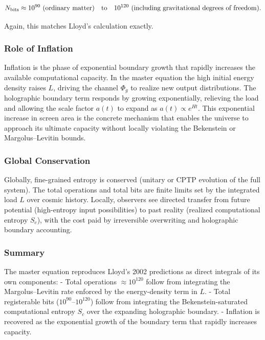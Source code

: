\documentclass[reprint,amsmath,amssymb,aps,prd,preprintnumbers,superscriptaddress,longbibliography,10pt]{revtex4-2}
\begin{document}
\[
N_{\rm bits} \approx 10^{90} \text{ (ordinary matter)} \quad \text{to} \quad 10^{120} \text{ (including gravitational degrees of freedom)}.
\]

Again, this matches Lloyd’s calculation exactly.

\subsubsection{Role of Inflation}

Inflation is the phase of exponential boundary growth that rapidly increases the available computational capacity. In the master equation the high initial energy density raises \(L\), driving the channel \(\Phi_g\) to realize new output distributions. The holographic boundary term responds by growing exponentially, relieving the load and allowing the scale factor \(a(t)\) to expand as \(a(t) \propto e^{Ht}\). This exponential increase in screen area is the concrete mechanism that enables the universe to approach its ultimate capacity without locally violating the Bekenstein or Margolus–Levitin bounds.

\subsubsection{Global Conservation}

Globally, fine-grained entropy is conserved (unitary or CPTP evolution of the full system). The total operations and total bits are finite limits set by the integrated load \(L\) over cosmic history. Locally, observers see directed transfer from future potential (high-entropy input possibilities) to past reality (realized computational entropy \(S_c\)), with the cost paid by irreversible overwriting and holographic boundary accounting.

\subsubsection{Summary}

The master equation reproduces Lloyd’s 2002 predictions as direct integrals of its own components:
- Total operations \(\approx 10^{120}\) follow from integrating the Margolus–Levitin rate enforced by the energy-density term in \(L\).
- Total registerable bits (\(10^{90}\)–\(10^{120}\)) follow from integrating the Bekenstein-saturated computational entropy \(S_c\) over the expanding holographic boundary.
- Inflation is recovered as the exponential growth of the boundary term that rapidly increases capacity.
\end{document}
